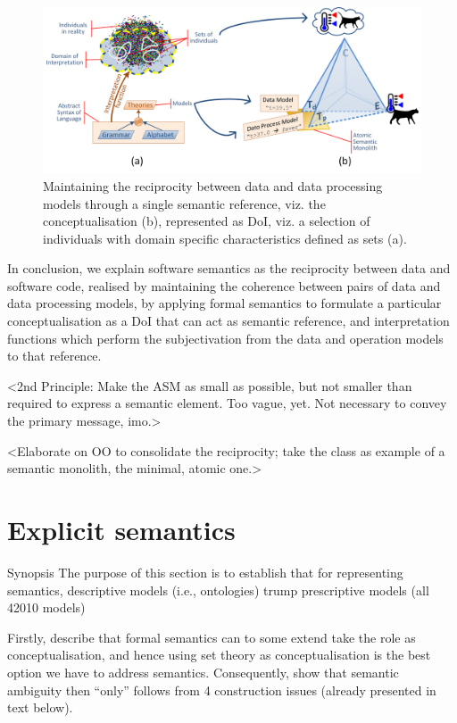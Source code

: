 \documentclass[a4paper,11pt,oneside,oldfontcommands]{memoir}
\theoremstyle{definition}
\theoremstyle{break}		%
\numberwithin{equation}{chapter}
\numberwithin{figure}{chapter}
\begin{document}
\begin{figure}
\hypertarget{fig:single-semantic-reference}{%
\centering
\includegraphics{src/images/SingleSemanticReference.png}
\caption{Maintaining the reciprocity between data and data processing
models through a single semantic reference, viz. the conceptualisation
(b), represented as DoI, viz. a selection of individuals with domain
specific characteristics defined as sets
(a).}\label{fig:single-semantic-reference}
}
\end{figure}

In conclusion, we explain software semantics as the reciprocity between
data and software code, realised by maintaining the coherence between
pairs of data and data processing models, by applying formal semantics
to formulate a particular conceptualisation as a DoI that can act as
semantic reference, and interpretation functions which perform the
subjectivation from the data and operation models to that reference.

\textless{}2nd Principle: Make the ASM as small as possible, but not
smaller than required to express a semantic element. Too vague, yet. Not
necessary to convey the primary message, imo.\textgreater{}

\textless{}Elaborate on OO to consolidate the reciprocity; take the
class as example of a semantic monolith, the minimal, atomic
one.\textgreater{}

\hypertarget{explicit-semantics}{%
\section{Explicit semantics}\label{explicit-semantics}}

Synopsis The purpose of this section is to establish that for
representing semantics, descriptive models (i.e., ontologies) trump
prescriptive models (all 42010 models)

Firstly, describe that formal semantics can to some extend take the role
as conceptualisation, and hence using set theory as conceptualisation is
the best option we have to address semantics. Consequently, show that
semantic ambiguity then ``only'' follows from 4 construction issues
(already presented in text below).
\end{document}
